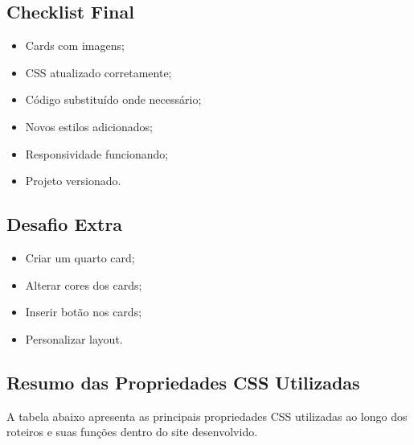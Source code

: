 \documentclass[12pt,a4paper]{article}
\begin{document}
\subsection{Checklist Final}

\begin{boxAtividade}

\begin{itemize}
\item Cards com imagens;
\item CSS atualizado corretamente;
\item Código substituído onde necessário;
\item Novos estilos adicionados;
\item Responsividade funcionando;
\item Projeto versionado.
\end{itemize}

\end{boxAtividade}


\subsection{Desafio Extra}

\begin{boxAtividade}

\begin{itemize}
\item Criar um quarto card;
\item Alterar cores dos cards;
\item Inserir botão nos cards;
\item Personalizar layout.
\end{itemize}

\end{boxAtividade}




\subsection{Resumo das Propriedades CSS Utilizadas}

    A tabela abaixo apresenta as principais propriedades CSS utilizadas ao longo dos roteiros e suas funções dentro do site desenvolvido.
    
\end{document}
